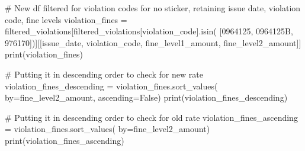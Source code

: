 \documentclass[
  letterpaper,
  DIV=11,
  numbers=noendperiod]{scrartcl}
\newenvironment{Shaded}{\begin{snugshade}}{\end{snugshade}}
\newcommand{\BuiltInTok}[1]{\textcolor[rgb]{0.00,0.23,0.31}{#1}}
\newcommand{\CommentTok}[1]{\textcolor[rgb]{0.37,0.37,0.37}{#1}}
\newcommand{\NormalTok}[1]{\textcolor[rgb]{0.00,0.23,0.31}{#1}}
\newcommand{\OperatorTok}[1]{\textcolor[rgb]{0.37,0.37,0.37}{#1}}
\newcommand{\StringTok}[1]{\textcolor[rgb]{0.13,0.47,0.30}{#1}}
\newcommand{\VariableTok}[1]{\textcolor[rgb]{0.07,0.07,0.07}{#1}}
\begin{document}
\begin{Shaded}
\begin{Highlighting}[]
\CommentTok{\# New df filtered for violation codes for no sticker, retaining issue date, violation code, fine levels}
\NormalTok{violation\_fines }\OperatorTok{=}\NormalTok{ filtered\_violations[filtered\_violations[}\StringTok{\textquotesingle{}violation\_code\textquotesingle{}}\NormalTok{].isin(}
\NormalTok{    [}\StringTok{\textquotesingle{}0964125\textquotesingle{}}\NormalTok{, }\StringTok{\textquotesingle{}0964125B\textquotesingle{}}\NormalTok{, }\StringTok{\textquotesingle{}976170\textquotesingle{}}\NormalTok{])][[}\StringTok{\textquotesingle{}issue\_date\textquotesingle{}}\NormalTok{, }\StringTok{\textquotesingle{}violation\_code\textquotesingle{}}\NormalTok{, }\StringTok{\textquotesingle{}fine\_level1\_amount\textquotesingle{}}\NormalTok{, }\StringTok{\textquotesingle{}fine\_level2\_amount\textquotesingle{}}\NormalTok{]]}
\BuiltInTok{print}\NormalTok{(violation\_fines)}

\CommentTok{\# Putting it in descending order to check for new rate}
\NormalTok{violation\_fines\_descending }\OperatorTok{=}\NormalTok{ violation\_fines.sort\_values(}
\NormalTok{    by}\OperatorTok{=}\StringTok{\textquotesingle{}fine\_level2\_amount\textquotesingle{}}\NormalTok{, ascending}\OperatorTok{=}\VariableTok{False}\NormalTok{)}
\BuiltInTok{print}\NormalTok{(violation\_fines\_descending)}

\CommentTok{\# Putting it in descending order to check for old rate}
\NormalTok{violation\_fines\_ascending }\OperatorTok{=}\NormalTok{ violation\_fines.sort\_values(}
\NormalTok{    by}\OperatorTok{=}\StringTok{\textquotesingle{}fine\_level2\_amount\textquotesingle{}}\NormalTok{)}
\BuiltInTok{print}\NormalTok{(violation\_fines\_ascending)}
\end{Highlighting}
\end{Shaded}
\end{document}

